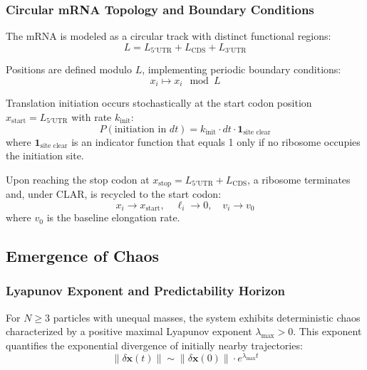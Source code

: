 \documentclass[11pt]{article}
\begin{document}
\subsubsection{Circular mRNA Topology and Boundary Conditions}

The mRNA is modeled as a circular track with distinct functional regions:
\begin{equation}
    L = L_{5'\text{UTR}} + L_{\text{CDS}} + L_{3'\text{UTR}}
\end{equation}

Positions are defined modulo $L$, implementing periodic boundary conditions:
\begin{equation}
    x_i \mapsto x_i \mod L
\end{equation}

Translation initiation occurs stochastically at the start codon position $x_{\text{start}} = L_{5'\text{UTR}}$ with rate $k_{\text{init}}$:
\begin{equation}
    P(\text{initiation in } dt) = k_{\text{init}} \cdot dt \cdot \mathbf{1}_{\text{site clear}}
\end{equation}
where $\mathbf{1}_{\text{site clear}}$ is an indicator function that equals 1 only if no ribosome occupies the initiation site.

Upon reaching the stop codon at $x_{\text{stop}} = L_{5'\text{UTR}} + L_{\text{CDS}}$, a ribosome terminates and, under CLAR, is recycled to the start codon:
\begin{equation}
    x_i \to x_{\text{start}}, \quad \ell_i \to 0, \quad v_i \to v_0
\end{equation}
where $v_0$ is the baseline elongation rate.

\subsection{Emergence of Chaos}

\subsubsection{Lyapunov Exponent and Predictability Horizon}

For $N \geq 3$ particles with unequal masses, the system exhibits deterministic chaos characterized by a positive maximal Lyapunov exponent $\lambda_{\max} > 0$. This exponent quantifies the exponential divergence of initially nearby trajectories:
\begin{equation}
    \|\delta \mathbf{x}(t)\| \sim \|\delta \mathbf{x}(0)\| \cdot e^{\lambda_{\max} t}
\end{equation}
\end{document}
